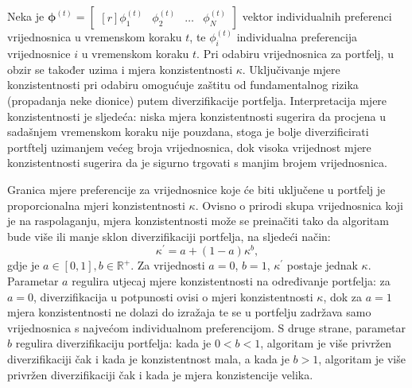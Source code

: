 \documentclass[lmodern, utf8, diplomski, numeric]{fer}
\newcommand{\matr}[1]{\mathbold{#1}}
\newcommand{\q}{\left}
\newcommand{\w}{\right}
\begin{document}
  Neka je $\matr{\phi}^{\q(t\w)} = \begin{bmatrix*}[r] \phi_1^{\q(t\w)} & \phi_2^{\q(t\w)} & \ldots & \phi_N^{\q(t\w)} \end{bmatrix*}$ vektor individualnih preferenci vrijednosnica u vremenskom koraku $t$, te $\phi_i^{\q(t\w)}$ individualna preferencija vrijednosnice $i$ u vremenskom koraku $t$.
  Pri odabiru vrijednosnica za portfelj, u obzir se također uzima i mjera konzistentnosti $\kappa$.
  Uključivanje mjere konzistentnosti pri odabiru omogućuje zaštitu od fundamentalnog rizika (propadanja neke dionice) putem diverzifikacije portfelja.
  Interpretacija mjere konzistentnosti je sljedeća: niska mjera konzistentnosti sugerira da procjena u sadašnjem vremenskom koraku nije pouzdana, stoga je bolje diverzificirati portftelj uzimanjem većeg broja vrijednosnica, dok visoka vrijednost mjere konzistentnosti sugerira da je sigurno trgovati s manjim brojem vrijednosnica.
    
  Granica mjere preferencije za vrijednosnice koje će biti uključene u portfelj je proporcionalna mjeri konzistentnosti $\kappa$.
  Ovisno o prirodi skupa vrijednosnica koji je na raspolaganju, mjera konzistentnosti može se preinačiti tako da algoritam bude više ili manje sklon diverzifikaciji portfelja, na sljedeći način:
  \begin{equation}
  \kappa^\prime = a + (1 - a)\kappa^b,
  \end{equation}
  gdje je $a \in [0, 1], b \in \mathbb{R}^+$.
  Za vrijednosti $a = 0$, $b = 1$, $\kappa^\prime$ postaje jednak $\kappa$.
  Parametar $a$ regulira utjecaj mjere konzistentnosti na određivanje portfelja: za $a = 0$, diverzifikacija u potpunosti ovisi o mjeri konzistentnosti $\kappa$, dok za $a = 1$ mjera konzistentnosti ne dolazi do izražaja te se u portfelju zadržava samo vrijednosnica s najvećom individualnom preferencijom.
  S druge strane, parametar $b$ regulira diverzifikaciju portfelja: kada je $0 < b < 1$, algoritam je više privržen diverzifikaciji čak i kada je konzistentnost mala, a kada je $b > 1$, algoritam je više privržen diverzifikaciji čak i kada je mjera konzistencije velika.
  
\end{document}
